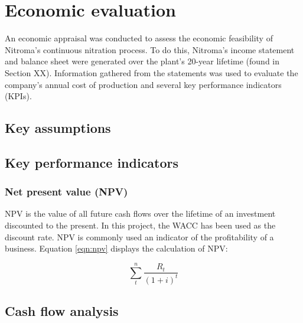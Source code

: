 \section{Economic evaluation}
An economic appraisal was conducted to assess the economic feasibility of Nitroma’s continuous nitration process. To do this, Nitroma’s income statement and balance sheet were generated over the plant’s 20-year lifetime (found in Section XX). Information gathered from the statements was used to evaluate the company’s annual cost of production and several key performance indicators (KPIs).

\subsection{Key assumptions}

\subsection{Key performance indicators}

\subsubsection{Net present value (NPV)}
NPV is the value of all future cash flows over the lifetime of an investment discounted to the present. In this project, the WACC has been used as the discount rate. NPV is commonly used an indicator of the profitability of a business. Equation \ref{eqn:npv} displays the calculation of NPV:

\begin{equation}
\label{eqn:npv}
    \sum_t^n\frac{R_{t}}{(1+i)^{t}}
\end{equation}



\subsection{Cash flow analysis}
